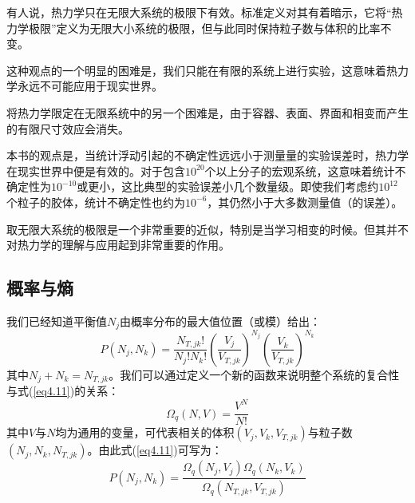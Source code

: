 \documentclass[UTF8]{ctexart}
\numberwithin{equation}{section}%
\numberwithin{figure}{section}%
\begin{document}
    有人说，热力学只在无限大系统的极限下有效。标准定义对其有着暗示，它将“热力学极限”定义为无限大小系统的极限，但与此同时保持粒子数与体积的比率不变。

    这种观点的一个明显的困难是，我们只能在有限的系统上进行实验，这意味着热力学永远不可能应用于现实世界。

    将热力学限定在无限系统中的另一个困难是，由于容器、表面、界面和相变而产生的有限尺寸效应会消失。

    本书的观点是，当统计浮动引起的不确定性远远小于测量量的实验误差时，热力学在现实世界中便是有效的。对于包含$10^{20}$个以上分子的宏观系统，这意味着统计不确定性为$10^{-10}$或更小，这比典型的实验误差小几个数量级。即使我们考虑约$10^{12}$个粒子的胶体，统计不确定性也约为$10^{-6}$，其仍然小于大多数测量值（的误差）。

    取无限大系统的极限是一个非常重要的近似，特别是当学习相变的时候。但其并不对热力学的理解与应用起到非常重要的作用。

    \subsection{概率与熵}\label{sec4.7}
    我们已经知道平衡值$N_j$由概率分布的最大值位置（或模）给出：
    \begin{equation}\label{eq4.11}
        P\left(N_{j}, N_{k}\right)=\frac{N_{T, j k} !}{N_{j} ! N_{k} !}\left(\frac{V_{j}}{V_{T, j k}}\right)^{N_{j}}\left(\frac{V_{k}}{V_{T, j k}}\right)^{N_{k}}
    \end{equation}
    其中$N_j+N_k=N_{T,jk}$。我们可以通过定义一个新的函数来说明整个系统的复合性与式(\ref{eq4.11})的关系：
    \begin{equation}\label{eq4.12}
        \Omega_{q}(N, V)=\frac{V^{N}}{N !}
    \end{equation}
    其中$V$与$N$均为通用的变量，可代表相关的体积$(V_j,V_k,V_{T,jk})$与粒子数$(N_j,N_k,N_{T,jk})$。由此式(\ref{eq4.11})可写为：
    \begin{equation}\label{eq4.13}
        P\left(N_{j}, N_{k}\right)=\frac{\Omega_{q}\left(N_{j}, V_{j}\right) \Omega_{q}\left(N_{k}, V_{k}\right)}{\Omega_{q}\left(N_{T, j k}, V_{T, j k}\right)}
    \end{equation}
\end{document}
